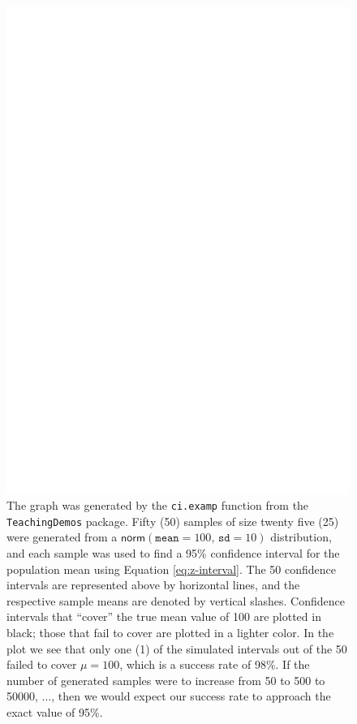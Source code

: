 \documentclass[captions=tableheading]{scrbook}
\begin{document}
\begin{figure}[th]
  \includegraphics[angle=270, totalheight=4in]{ps/carscatter.ps}
  \caption[Simulated confidence intervals]{\small The graph was generated by the \texttt{ci.examp} function from the \texttt{TeachingDemos} package. Fifty (50) samples of size twenty five (25) were generated from a \( \mathsf{norm}(\mathtt{mean}=100,\,\mathtt{sd}=10) \) distribution, and each sample was used to find a 95\% confidence interval for the population mean using Equation \ref{eq:z-interval}. The 50 confidence intervals are represented above by horizontal lines, and the respective sample means are denoted by vertical slashes. Confidence intervals that ``cover'' the true mean value of 100 are plotted in black; those that fail to cover are plotted in a lighter color. In the plot we see that only one (1) of the simulated intervals out of the 50 failed to cover \(\mu=100\), which is a success rate of 98\%. If the number of generated samples were to increase from 50 to 500 to 50000, ..., then we would expect our success rate to approach the exact value of 95\%.}
  \label{fig:Scatter-cars}
\end{figure}
\end{document}
